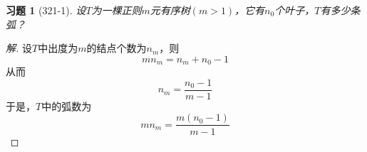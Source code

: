 \documentclass{article}
\begin{document}
\begin{CJK}{UTF8}{gbsn}
  \newtheorem*{Exercise}{习题}
  \huge
\begin{Exercise}[321-1]
  设$T$为一棵正则$m$元有序树$(m>1)$，它有$n_0$个叶子，$T$有多少条弧？
\end{Exercise}
\begin{proof}[解]
  设$T$中出度为$m$的结点个数为$n_m$，则\[mn_m=n_m+n_0-1\]
  从而\[n_m=\frac{n_0-1}{m-1}\]
  于是，$T$中的弧数为\[mn_m=\frac{m(n_0-1)}{m-1}\]
\end{proof}
\end{CJK}
\end{document}
